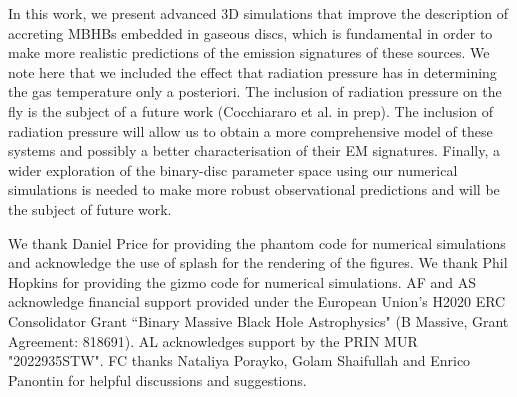\documentclass{aa}
\begin{document}
In this work, we present advanced 3D simulations that improve the description of accreting MBHBs embedded in gaseous discs, which is fundamental in order to make more realistic predictions of the emission signatures of these sources.
We note here that we included the effect that radiation pressure has in determining the gas temperature only a posteriori. The inclusion of radiation pressure on the fly is the subject of a future work (Cocchiararo et al. in prep). The inclusion of radiation pressure will allow us to obtain a more comprehensive model of these systems and possibly a better characterisation of their EM signatures. Finally, a wider exploration of the binary-disc parameter space using our numerical simulations is needed to make more robust observational predictions and will be the subject of future work.

\begin{acknowledgements}
We thank Daniel Price for providing the {\sc phantom} code for numerical simulations and acknowledge the use of {\sc splash} \citep{Price2007} for the rendering of the figures.
We thank Phil Hopkins for providing the {\sc gizmo} code for numerical simulations. 
AF and AS acknowledge financial support provided under the European Union’s H2020 ERC Consolidator Grant ``Binary Massive Black Hole Astrophysics" (B Massive, Grant Agreement: 818691). AL acknowledges support by the PRIN MUR "2022935STW".
FC thanks Nataliya Porayko, Golam Shaifullah and Enrico Panontin for helpful discussions and suggestions.
\end{acknowledgements}

%
%

\end{document}
